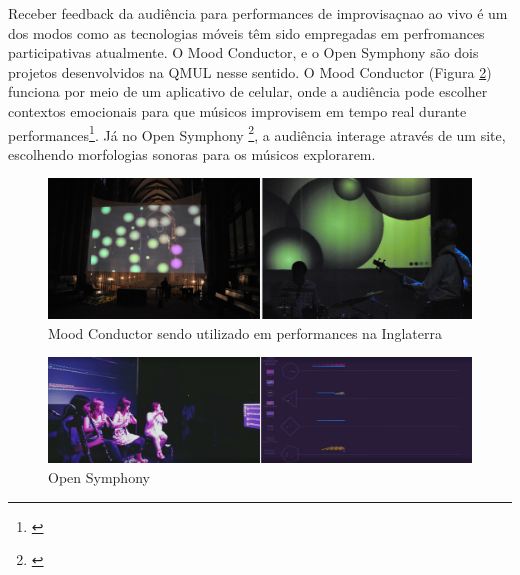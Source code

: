 
Receber feedback da audiência para performances de improvisaçnao ao vivo é um dos modos como as tecnologias móveis têm sido empregadas em perfromances participativas atualmente. O Mood Conductor, e o Open Symphony são dois projetos desenvolvidos na QMUL nesse sentido. O Mood Conductor (Figura \ref{moodconductor}) funciona por meio de um aplicativo de celular, onde a audiência pode escolher contextos emocionais para que músicos improvisem em tempo real durante performances\footnote{\cite{Fazekas:2014}}. Já no Open Symphony \footnote{\cite{wu2017open}}, a audiência interage através de um site, escolhendo morfologias sonoras para os músicos explorarem. 

\begin{figure}
    \caption{\label{moodconductor}Mood Conductor sendo utilizado em performances na Inglaterra}
    \begin{center}
        \includegraphics[width=1\linewidth]{pictures/cap3/moodconductor}
    \end{center}
\end{figure}

\begin{figure}
    \caption{\label{moodconductor}Open Symphony}
    \begin{center}
        \includegraphics[width=1\linewidth]{pictures/cap3/opensymphony}
    \end{center}
\end{figure}

